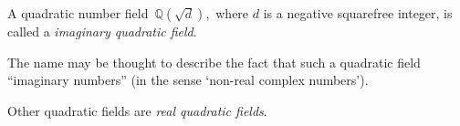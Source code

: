 \documentclass[12pt]{article}
\theoremstyle{definition}
\begin{document}
A quadratic number field \,$\mathbb{Q}(\sqrt{d})$,\, where $d$ is a negative squarefree integer, is called a {\em imaginary quadratic field}.

The name may be thought to describe the fact that such a quadratic field  ``imaginary numbers'' (in the sense `non-real complex numbers').

Other quadratic fields are {\em real quadratic fields}.

\end{document}
